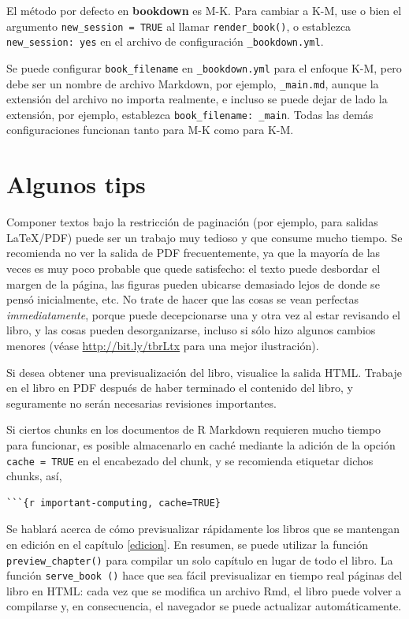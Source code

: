 \documentclass[12pt,]{krantz}
\theoremstyle{definition}
\theoremstyle{definition}
\theoremstyle{definition}
\theoremstyle{remark}
\begin{document}
El método por defecto en \textbf{bookdown} es M-K. Para cambiar a K-M,
use o bien el argumento \texttt{new\_session\ =\ TRUE} al llamar
\texttt{render\_book()}, o establezca \texttt{new\_session:\ yes} en el
archivo de configuración \texttt{\_bookdown.yml}.

Se puede configurar \texttt{book\_filename} en \texttt{\_bookdown.yml}
para el enfoque K-M, pero debe ser un nombre de archivo Markdown, por
ejemplo, \texttt{\_main.md}, aunque la extensión del archivo no importa
realmente, e incluso se puede dejar de lado la extensión, por ejemplo,
establezca \texttt{book\_filename:\ \_main}. Todas las demás
configuraciones funcionan tanto para M-K como para K-M.

\section{Algunos tips}\label{algunos-tips}

Componer textos bajo la restricción de paginación (por ejemplo, para
salidas LaTeX/PDF) puede ser un trabajo muy tedioso y que consume mucho
tiempo. Se recomienda no ver la salida de PDF frecuentemente, ya que la
mayoría de las veces es muy poco probable que quede satisfecho: el texto
puede desbordar el margen de la página, las figuras pueden ubicarse
demasiado lejos de donde se pensó inicialmente, etc. No trate de hacer
que las cosas se vean perfectas \emph{immediatamente}, porque puede
decepcionarse una y otra vez al estar revisando el libro, y las cosas
pueden desorganizarse, incluso si sólo hizo algunos cambios menores
(véase \url{http://bit.ly/tbrLtx} para una mejor ilustración).

Si desea obtener una previsualización del libro, visualice la salida
HTML. Trabaje en el libro en PDF después de haber terminado el contenido
del libro, y seguramente no serán necesarias revisiones importantes.

Si ciertos chunks en los documentos de R Markdown requieren mucho tiempo
para funcionar, es posible almacenarlo en caché mediante la adición de
la opción \texttt{cache\ =\ TRUE} en el encabezado del chunk, y se
recomienda etiquetar dichos chunks, así,

\begin{verbatim}
```{r important-computing, cache=TRUE}
\end{verbatim}

Se hablará acerca de cómo previsualizar rápidamente los libros que se
mantengan en edición en el capítulo \ref{edicion}. En resumen, se puede
utilizar la función \texttt{preview\_chapter()} para compilar un solo
capítulo en lugar de todo el libro. La función \texttt{serve\_book\ ()}
hace que sea fácil previsualizar en tiempo real páginas del libro en
HTML: cada vez que se modifica un archivo Rmd, el libro puede volver a
compilarse y, en consecuencia, el navegador se puede actualizar
automáticamente.
\end{document}
